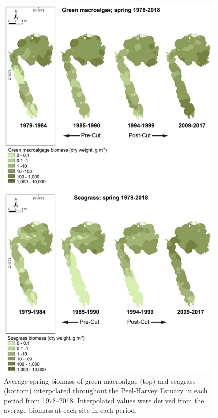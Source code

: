 \documentclass[
]{book}
\begin{document}
\begin{figure}
\includegraphics[width=1\linewidth]{images/macrophytes/picture9} \caption{Average spring biomass of green macroalgae (top) and seagrass (bottom) interpolated throughout the Peel-Harvey Estuary in each period from 1978–2018. Interpolated values were derived from the average biomass at each site in each period.}\label{fig:macrophytes-pic9}
\end{figure}
\end{document}
